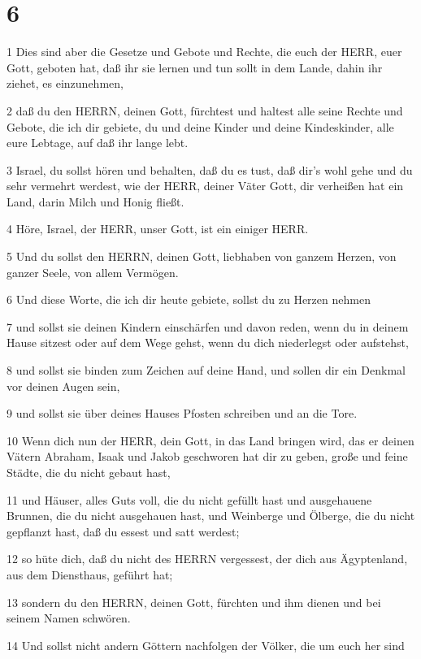 \chapter{6}

\par 1 Dies sind aber die Gesetze und Gebote und Rechte, die euch der HERR, euer Gott, geboten hat, daß ihr sie lernen und tun sollt in dem Lande, dahin ihr ziehet, es einzunehmen,
\par 2 daß du den HERRN, deinen Gott, fürchtest und haltest alle seine Rechte und Gebote, die ich dir gebiete, du und deine Kinder und deine Kindeskinder, alle eure Lebtage, auf daß ihr lange lebt.
\par 3 Israel, du sollst hören und behalten, daß du es tust, daß dir's wohl gehe und du sehr vermehrt werdest, wie der HERR, deiner Väter Gott, dir verheißen hat ein Land, darin Milch und Honig fließt.
\par 4 Höre, Israel, der HERR, unser Gott, ist ein einiger HERR.
\par 5 Und du sollst den HERRN, deinen Gott, liebhaben von ganzem Herzen, von ganzer Seele, von allem Vermögen.
\par 6 Und diese Worte, die ich dir heute gebiete, sollst du zu Herzen nehmen
\par 7 und sollst sie deinen Kindern einschärfen und davon reden, wenn du in deinem Hause sitzest oder auf dem Wege gehst, wenn du dich niederlegst oder aufstehst,
\par 8 und sollst sie binden zum Zeichen auf deine Hand, und sollen dir ein Denkmal vor deinen Augen sein,
\par 9 und sollst sie über deines Hauses Pfosten schreiben und an die Tore.
\par 10 Wenn dich nun der HERR, dein Gott, in das Land bringen wird, das er deinen Vätern Abraham, Isaak und Jakob geschworen hat dir zu geben, große und feine Städte, die du nicht gebaut hast,
\par 11 und Häuser, alles Guts voll, die du nicht gefüllt hast und ausgehauene Brunnen, die du nicht ausgehauen hast, und Weinberge und Ölberge, die du nicht gepflanzt hast, daß du essest und satt werdest;
\par 12 so hüte dich, daß du nicht des HERRN vergessest, der dich aus Ägyptenland, aus dem Diensthaus, geführt hat;
\par 13 sondern du den HERRN, deinen Gott, fürchten und ihm dienen und bei seinem Namen schwören.
\par 14 Und sollst nicht andern Göttern nachfolgen der Völker, die um euch her sind
